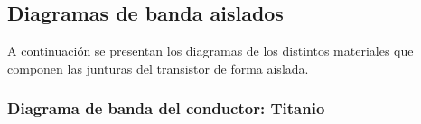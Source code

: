 \documentclass[a4paper]{article}
\begin{document}

\subsection{Diagramas de banda aislados}
A continuación se presentan los diagramas de los distintos materiales que componen las junturas del transistor de forma aislada.

\subsubsection{Diagrama de banda del conductor: Titanio}
\end{document}
